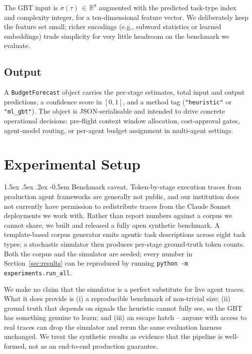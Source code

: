 \documentclass{article}
\makeatletter
\newcommand{\code}[1]{\texttt{\small #1}}
\renewcommand\paragraph{%
  \@startsection{paragraph}{4}{\z@}%
    {1.5ex \@plus.5ex \@minus.2ex}%
    {-0.5em}%
    {\normalfont\normalsize\bfseries}%
}
\makeatother
\begin{document}
The GBT input is $\sigma(\tau)\,{\in}\,\mathbb{R}^{8}$ augmented with
the predicted task-type index and complexity integer, for a
ten-dimensional feature vector. We deliberately keep the feature set
small; richer encodings (e.g., subword statistics or learned
embeddings) trade simplicity for very little headroom on the benchmark
we evaluate.

\subsection{Output}

A \code{BudgetForecast} object carries the per-stage estimates, total
input and output predictions, a confidence score in $[0,1]$, and a method
tag (\code{"heuristic"} or \code{"ml\_gbt"}). The object is JSON-serialisable
and intended to drive concrete operational decisions: pre-flight context
window allocation, cost-approval gates, agent-model routing, or per-agent
budget assignment in multi-agent settings.

\section{Experimental Setup}
\label{sec:setup}

\paragraph{Benchmark caveat.}
Token-by-stage execution traces from production agent frameworks are
generally not public, and our institution does not currently have
permission to redistribute traces from the Claude Sonnet deployments we
work with. Rather than report numbers against a corpus we cannot share,
we built and released a fully open synthetic benchmark. A template-based
corpus generator emits agentic task descriptions across eight task
types; a stochastic simulator then produces per-stage ground-truth token
counts. Both the corpus and the simulator are seeded; every number in
Section~\ref{sec:results} can be reproduced by running
\code{python -m experiments.run\_all}.

We make no claim that the simulator is a perfect substitute for live
agent traces. What it does provide is (i) a reproducible benchmark of
non-trivial size; (ii) ground truth that depends on signals the heuristic
cannot fully see, so the GBT has something genuine to learn; and (iii) an
escape hatch -- anyone with access to real traces can drop the simulator
and rerun the same evaluation harness unchanged. We treat the synthetic
results as evidence that the pipeline is well-formed, not as an end-to-end
production guarantee.
\end{document}
